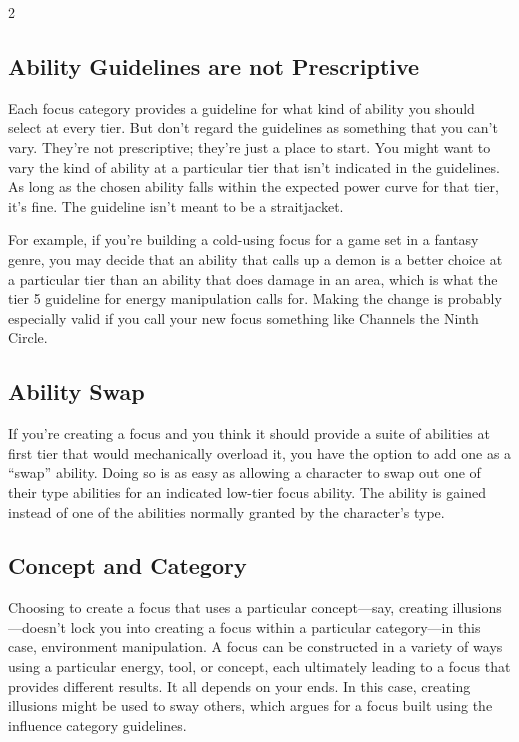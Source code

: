 \begin{multicols}{2}
\subsection{Ability Guidelines are not Prescriptive}

Each focus category provides a guideline for what kind of ability you should select at every tier. But don’t regard the guidelines as something that you can’t vary. They’re not prescriptive; they’re just a place to start. You might want to vary the kind of ability at a particular tier that isn’t indicated in the guidelines. As long as the chosen ability falls within the expected power curve for that tier, it’s fine. The guideline isn’t meant to be a straitjacket.

For example, if you’re building a cold-using focus for a game set in a fantasy genre, you may decide that an ability that calls up a demon is a better choice at a particular tier than an ability that does damage in an area, which is what the tier 5 guideline for energy manipulation calls for. Making the change is probably especially valid if you call your new focus something like Channels the Ninth Circle.

\subsection{Ability Swap}

If you’re creating a focus and you think it should provide a suite of abilities at first tier that would mechanically overload it, you have the option to add one as a “swap” ability. Doing so is as easy as allowing a character to swap out one of their type abilities for an indicated low-tier focus ability. The ability is gained instead of one of the abilities normally granted by the character’s type.

\subsection{Concept and Category}

Choosing to create a focus that uses a particular concept—say, creating illusions—doesn’t lock you into creating a focus within a particular category—in this case, environment manipulation. A focus can be constructed in a variety of ways using a particular energy, tool, or concept, each ultimately leading to a focus that provides different results. It all depends on your ends. In this case, creating illusions might be used to sway others, which argues for a focus built using the influence category guidelines.


\end{multicols}

